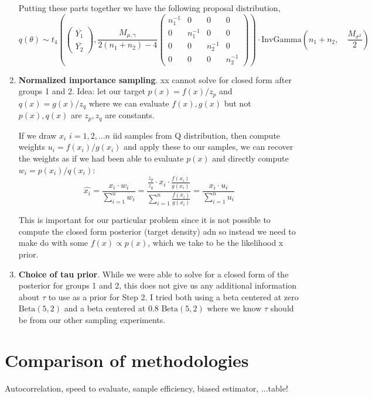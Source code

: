 \documentclass[12pt,letterpaper,twoside]{article}
\begin{document}
\begin{enumerate}[label=(\alph*)]
    Putting these parts together we have the following proposal distribution,
    $$ q(\theta) \sim t_4\left(\left(\begin{matrix*}
        \overline{Y_1}\\ \overline{Y_2} \end{matrix*}\right), \frac{M_{\mu, \gamma}}{2(n_1 + n_2) - 4}\left(\begin{matrix*}
        n_1^{-1} & 0 & 0 & 0 \\ 0 & n_1^{-1} & 0 & 0 \\ 0 & 0 & n_2^{-1} & 0 \\ 0 & 0 & 0 & n_2^{-1}
        \end{matrix*}\right)\right) \cdot \text{InvGamma}\left(n_1+n_2, \quad \frac{M_{\sigma^2}}{2} \right) $$

    \item \textbf{Normalized importance sampling}. xx cannot solve for closed form after groups 1 and 2.
    Idea: let our target $p(x) = f(x) / z_p$ and $q(x) = g(x) / z_q$ where 
    we can evaluate $f(x), g(x)$ but not $p(x), q(x)$ are $z_p, z_q$ are 
    constants. \newline

    If we draw $x_i$ $i=1,2,...n$ iid samples from Q distribution, then compute 
    weights $u_i = f(x_i) / g(x_i)$ and apply these to our samples, we can 
    recover the weights as if we had been able to evaluate $p(x)$ and 
    directly compute $w_i = p(x_i) / q(x_i)$:
    $$ \hat{x_i} = \frac{x_i \cdot w_i}{\sum_{i=1}^n w_i} = \frac{\frac{z_p}{z_q} \cdot x_i \cdot \frac{f(x_i)}{g(x_i)}}{\sum_{i=1}^n \frac{f(x_i)}{g(x_i)}} = \frac{x_i \cdot u_i}{\sum_{i=1}^n u_i}$$

    This is important for our particular problem since it is not possible 
    to compute the closed form posterior (target density) adn so instead 
    we need to make do with some $f(x) \propto p(x)$, which we take to be
    the likelihood x prior.

    \item \textbf{Choice of tau prior}. While we were able to solve for a 
    closed form of the posterior for groups 1 and 2, this does not give us 
    any additional information about $\tau$ to use as a prior for Step 2. 
    I tried both using a beta centered at zero $\text{Beta}(5, 2)$ and a 
    beta centered at 0.8 $\text{Beta}(5, 2)$ where we know $\tau$ should 
    be from our other sampling experiments.  
\end{enumerate}


\section{Comparison of methodologies} Autocorrelation, speed to evaluate, sample efficiency,
 biased estimator, ...table!
 
\end{document}
